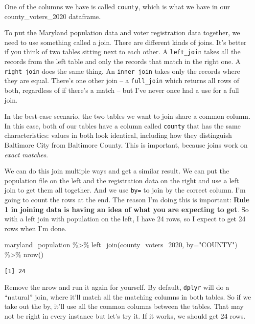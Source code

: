 \documentclass[
  letterpaper,
  DIV=11,
  numbers=noendperiod]{scrreprt}
\newenvironment{Shaded}{\begin{snugshade}}{\end{snugshade}}
\newcommand{\AttributeTok}[1]{\textcolor[rgb]{0.40,0.45,0.13}{#1}}
\newcommand{\FunctionTok}[1]{\textcolor[rgb]{0.28,0.35,0.67}{#1}}
\newcommand{\NormalTok}[1]{\textcolor[rgb]{0.00,0.23,0.31}{#1}}
\newcommand{\SpecialCharTok}[1]{\textcolor[rgb]{0.37,0.37,0.37}{#1}}
\newcommand{\StringTok}[1]{\textcolor[rgb]{0.13,0.47,0.30}{#1}}
\begin{document}
One of the columns we have is called \texttt{county}, which is what we
have in our county\_voters\_2020 dataframe.

To put the Maryland population data and voter registration data
together, we need to use something called a join. There are different
kinds of joins. It's better if you think of two tables sitting next to
each other. A \texttt{left\_join} takes all the records from the left
table and only the records that match in the right one. A
\texttt{right\_join} does the same thing. An \texttt{inner\_join} takes
only the records where they are equal. There's one other join -- a
\texttt{full\_join} which returns all rows of both, regardless of if
there's a match -- but I've never once had a use for a full join.

In the best-case scenario, the two tables we want to join share a common
column. In this case, both of our tables have a column called
\texttt{county} that has the same characteristics: values in both look
identical, including how they distinguish Baltimore City from Baltimore
County. This is important, because joins work on \emph{exact matches}.

We can do this join multiple ways and get a similar result. We can put
the population file on the left and the registration data on the right
and use a left join to get them all together. And we use \texttt{by=} to
join by the correct column. I'm going to count the rows at the end. The
reason I'm doing this is important: \textbf{Rule 1 in joining data is
having an idea of what you are expecting to get}. So with a left join
with population on the left, I have 24 rows, so I expect to get 24 rows
when I'm done.

\begin{Shaded}
\begin{Highlighting}[]
\NormalTok{maryland\_population }\SpecialCharTok{\%\textgreater{}\%} \FunctionTok{left\_join}\NormalTok{(county\_voters\_2020, }\AttributeTok{by=}\StringTok{"COUNTY"}\NormalTok{) }\SpecialCharTok{\%\textgreater{}\%} \FunctionTok{nrow}\NormalTok{()}
\end{Highlighting}
\end{Shaded}

\begin{verbatim}
[1] 24
\end{verbatim}

Remove the nrow and run it again for yourself. By default,
\texttt{dplyr} will do a ``natural'' join, where it'll match all the
matching columns in both tables. So if we take out the by, it'll use all
the common columns between the tables. That may not be right in every
instance but let's try it. If it works, we should get 24 rows.
\end{document}

